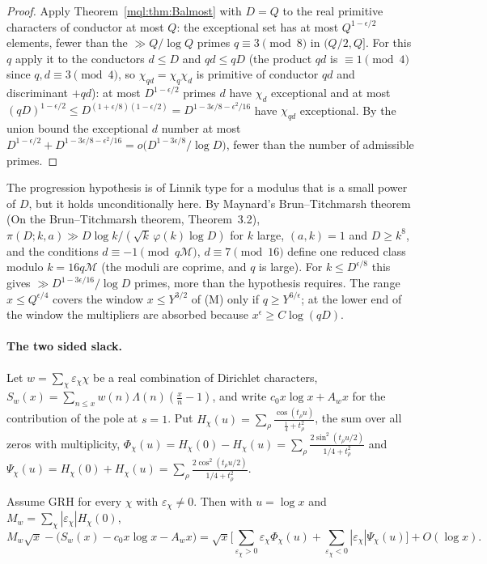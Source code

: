 \begin{proof}
Apply Theorem~\ref{mql:thm:Balmost} with $D=Q$ to the real primitive characters of conductor at most $Q$: the exceptional set has at most $Q^{1-\epsilon/2}$ elements, fewer than the $\gg Q/\log Q$ primes $q\equiv3\pmod8$ in $(Q/2,Q]$. For this $q$ apply it to the conductors $d\le D$ and $qd\le qD$ (the product $qd$ is $\equiv1\pmod4$ since $q,d\equiv3\pmod4$, so $\chi_{qd}=\chi_q\chi_d$ is primitive of conductor $qd$ and discriminant $+qd$): at most $D^{1-\epsilon/2}$ primes $d$ have $\chi_{d}$ exceptional and at most $(qD)^{1-\epsilon/2}\le D^{(1+\epsilon/8)(1-\epsilon/2)}=D^{1-3\epsilon/8-\epsilon^2/16}$ have $\chi_{qd}$ exceptional. By the union bound the exceptional $d$ number at most $D^{1-\epsilon/2}+D^{1-3\epsilon/8-\epsilon^2/16}=o\big(D^{1-3\epsilon/8}/\log D\big)$, fewer than the number of admissible primes.
\end{proof}

The progression hypothesis is of Linnik type for a modulus that is a small power of $D$, but it holds unconditionally here. By Maynard's Brun--Titchmarsh theorem (On the Brun--Titchmarsh theorem, Theorem~3.2), $\pi(D;k,a)\gg D\log k/(\sqrt k\,\varphi(k)\log D)$ for $k$ large, $(a,k)=1$ and $D\ge k^8$, and the conditions $d\equiv-1\pmod{q\mathcal M}$, $d\equiv7\pmod{16}$ define one reduced class modulo $k=16q\mathcal M$ (the moduli are coprime, and $q$ is large). For $k\le D^{\epsilon/8}$ this gives $\gg D^{1-3\epsilon/16}/\log D$ primes, more than the hypothesis requires. The range $x\le Q^{\epsilon/4}$ covers the window $x\le Y^{3/2}$ of (M) only if $q\ge Y^{6/\epsilon}$; at the lower end of the window the multipliers are absorbed because $x^\epsilon\ge C\log(qD)$.

\paragraph{The two sided slack.} Let $w=\sum_\chi \varepsilon_\chi\chi$ be a real combination of Dirichlet characters, $S_w(x)=\sum_{n\le x}w(n)\Lambda(n)(\frac xn-1)$, and write $c_0x\log x+A_wx$ for the contribution of the pole at $s=1$. Put $H_\chi(u)=\sum_\rho\frac{\cos(t_\rho u)}{\frac14+t_\rho^2}$, the sum over all zeros with multiplicity, $\Phi_\chi(u)=H_\chi(0)-H_\chi(u)=\sum_\rho\frac{2\sin^2(t_\rho u/2)}{1/4+t_\rho^2}$ and $\Psi_\chi(u)=H_\chi(0)+H_\chi(u)=\sum_\rho\frac{2\cos^2(t_\rho u/2)}{1/4+t_\rho^2}$.

\begin{proposition}\label{mql:prop:twosided}
Assume GRH for every $\chi$ with $\varepsilon_\chi\ne0$. Then with $u=\log x$ and $M_w=\sum_\chi|\varepsilon_\chi|H_\chi(0)$,
\[
M_w\sqrt x-\big(S_w(x)-c_0x\log x-A_wx\big)=\sqrt x\Big[\sum_{\varepsilon_\chi>0}\varepsilon_\chi\Phi_\chi(u)+\sum_{\varepsilon_\chi<0}|\varepsilon_\chi|\Psi_\chi(u)\Big]+O(\log x).
\]
\end{proposition}

